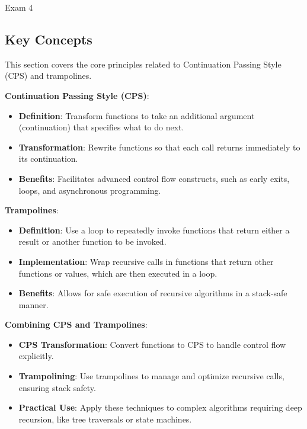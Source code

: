 \begin{examnotes}{Exam 4}
    \subsection*{Key Concepts}
    
    \begin{highlight}
        This section covers the core principles related to Continuation Passing Style (CPS) and trampolines.
    
        \textbf{Continuation Passing Style (CPS)}:
        \begin{itemize}
            \item \textbf{Definition}: Transform functions to take an additional argument (continuation) that specifies what to do next.
            \item \textbf{Transformation}: Rewrite functions so that each call returns immediately to its continuation.
            \item \textbf{Benefits}: Facilitates advanced control flow constructs, such as early exits, loops, and asynchronous programming.
        \end{itemize}
        
        \textbf{Trampolines}:
        \begin{itemize}
            \item \textbf{Definition}: Use a loop to repeatedly invoke functions that return either a result or another function to be invoked.
            \item \textbf{Implementation}: Wrap recursive calls in functions that return other functions or values, which are then executed in a loop.
            \item \textbf{Benefits}: Allows for safe execution of recursive algorithms in a stack-safe manner.
        \end{itemize}
        
        \textbf{Combining CPS and Trampolines}:
        \begin{itemize}
            \item \textbf{CPS Transformation}: Convert functions to CPS to handle control flow explicitly.
            \item \textbf{Trampolining}: Use trampolines to manage and optimize recursive calls, ensuring stack safety.
            \item \textbf{Practical Use}: Apply these techniques to complex algorithms requiring deep recursion, like tree traversals or state machines.
        \end{itemize}
    \end{highlight}
\end{examnotes}

